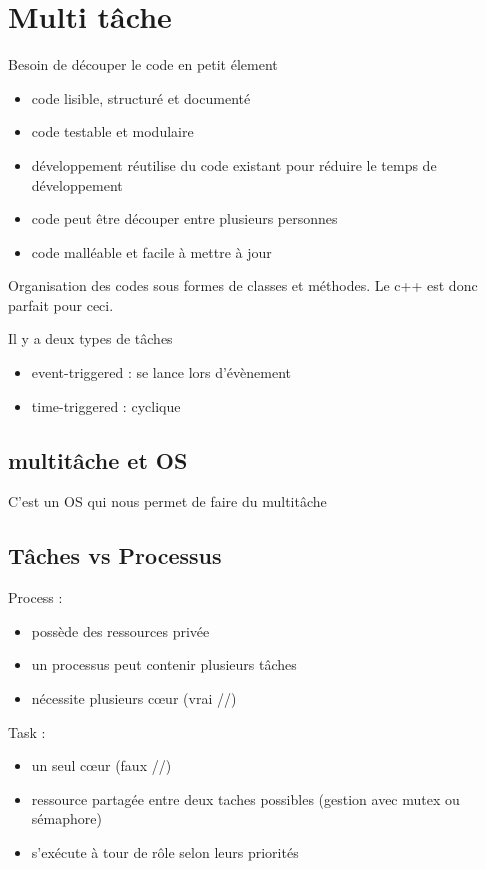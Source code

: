 \documentclass[resume]{subfiles}
\begin{document}
\section{Multi tâche}

Besoin de découper le code en petit élement 
\begin{itemize}
\item code lisible, structuré et documenté
\item code testable et modulaire
\item développement réutilise du code existant pour réduire le temps de développement
\item code peut être découper entre plusieurs personnes
\item code malléable et facile à mettre à jour 
\end{itemize}

Organisation des codes sous formes de classes et méthodes. Le c++ est donc parfait pour ceci.

Il y a deux types de tâches 
\begin{itemize}
\item event-triggered : se lance lors d'évènement
\item time-triggered : cyclique
\end{itemize}

\subsection{multitâche et OS}

C'est un OS qui nous permet de faire du multitâche 

\subsection{Tâches vs Processus}

Process :
\begin{itemize}
\item possède des ressources privée
\item un processus peut contenir plusieurs tâches 
\item nécessite plusieurs cœur (vrai //)
\end{itemize}

Task :
\begin{itemize}
\item un seul cœur (faux //)
\item ressource partagée entre deux taches possibles (gestion avec mutex ou sémaphore) 
\item s'exécute à tour de rôle selon leurs priorités
\end{itemize}
\end{document}
